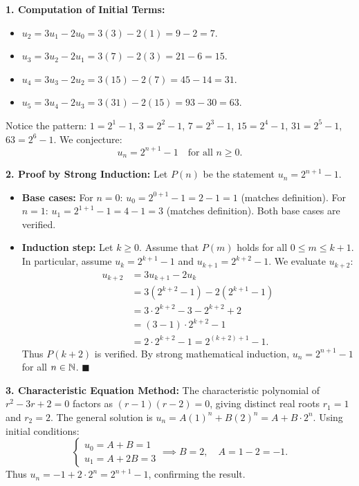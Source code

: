 \begin{solution}
\textbf{1. Computation of Initial Terms:}
\begin{itemize}[leftmargin=1.5em,itemsep=2pt]
  \item $u_2 = 3u_1 - 2u_0 = 3(3) - 2(1) = 9 - 2 = 7$.
  \item $u_3 = 3u_2 - 2u_1 = 3(7) - 2(3) = 21 - 6 = 15$.
  \item $u_4 = 3u_3 - 2u_2 = 3(15) - 2(7) = 45 - 14 = 31$.
  \item $u_5 = 3u_4 - 2u_3 = 3(31) - 2(15) = 93 - 30 = 63$.
\end{itemize}
Notice the pattern: $1 = 2^1 - 1$, $3 = 2^2 - 1$, $7 = 2^3 - 1$, $15 = 2^4 - 1$, $31 = 2^5 - 1$, $63 = 2^6 - 1$.
We conjecture:
\[
u_n = 2^{n+1} - 1 \quad \text{for all } n \ge 0.
\]

\textbf{2. Proof by Strong Induction:}
Let $P(n)$ be the statement $u_n = 2^{n+1} - 1$.
\begin{itemize}[leftmargin=1.5em,itemsep=2pt]
  \item \textbf{Base cases:}
  For $n=0$: $u_0 = 2^{0+1} - 1 = 2 - 1 = 1$ (matches definition).
  For $n=1$: $u_1 = 2^{1+1} - 1 = 4 - 1 = 3$ (matches definition).
  Both base cases are verified.
  \item \textbf{Induction step:} Let $k \ge 0$. Assume that $P(m)$ holds for all $0 \le m \le k+1$. In particular, assume $u_k = 2^{k+1}-1$ and $u_{k+1} = 2^{k+2}-1$.
  We evaluate $u_{k+2}$:
  \begin{align*}
  u_{k+2} &= 3u_{k+1} - 2u_k \\
  &= 3(2^{k+2} - 1) - 2(2^{k+1} - 1) \\
  &= 3 \cdot 2^{k+2} - 3 - 2^{k+2} + 2 \\
  &= (3 - 1) \cdot 2^{k+2} - 1 \\
  &= 2 \cdot 2^{k+2} - 1 = 2^{(k+2)+1} - 1.
  \end{align*}
  Thus $P(k+2)$ is verified. By strong mathematical induction, $u_n = 2^{n+1} - 1$ for all $n \in \mathbb{N}$. \hfill $\blacksquare$
\end{itemize}

\textbf{3. Characteristic Equation Method:}
The characteristic polynomial of $r^2 - 3r + 2 = 0$ factors as $(r-1)(r-2) = 0$, giving distinct real roots $r_1 = 1$ and $r_2 = 2$.
The general solution is $u_n = A(1)^n + B(2)^n = A + B \cdot 2^n$.
Using initial conditions:
\[
\begin{cases}
u_0 = A + B = 1 \\
u_1 = A + 2B = 3
\end{cases}
\implies B = 2, \quad A = 1 - 2 = -1.
\]
Thus $u_n = -1 + 2 \cdot 2^n = 2^{n+1} - 1$, confirming the result.
\end{solution}

